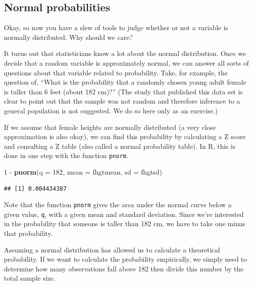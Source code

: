 \documentclass[]{article}
\newenvironment{Shaded}{\begin{snugshade}}{\end{snugshade}}
\newcommand{\KeywordTok}[1]{\textcolor[rgb]{0.13,0.29,0.53}{\textbf{{#1}}}}
\newcommand{\DataTypeTok}[1]{\textcolor[rgb]{0.13,0.29,0.53}{{#1}}}
\newcommand{\DecValTok}[1]{\textcolor[rgb]{0.00,0.00,0.81}{{#1}}}
\newcommand{\StringTok}[1]{\textcolor[rgb]{0.31,0.60,0.02}{{#1}}}
\newcommand{\NormalTok}[1]{{#1}}
\begin{document}
\subsection{Normal probabilities}\label{normal-probabilities}

Okay, so now you have a slew of tools to judge whether or not a variable
is normally distributed. Why should we care?

It turns out that statisticians know a lot about the normal
distribution. Once we decide that a random variable is approximately
normal, we can answer all sorts of questions about that variable related
to probability. Take, for example, the question of, ``What is the
probability that a randomly chosen young adult female is taller than 6
feet (about 182 cm)?'' (The study that published this data set is clear
to point out that the sample was not random and therefore inference to a
general population is not suggested. We do so here only as an exercise.)

If we assume that female heights are normally distributed (a very close
approximation is also okay), we can find this probability by calculating
a Z score and consulting a Z table (also called a normal probability
table). In R, this is done in one step with the function \texttt{pnorm}.

\begin{Shaded}
\begin{Highlighting}[]
\DecValTok{1} \NormalTok{-}\StringTok{ }\KeywordTok{pnorm}\NormalTok{(}\DataTypeTok{q =} \DecValTok{182}\NormalTok{, }\DataTypeTok{mean =} \NormalTok{fhgtmean, }\DataTypeTok{sd =} \NormalTok{fhgtsd)}
\end{Highlighting}
\end{Shaded}

\begin{verbatim}
## [1] 0.004434387
\end{verbatim}

Note that the function \texttt{pnorm} gives the area under the normal
curve below a given value, \texttt{q}, with a given mean and standard
deviation. Since we're interested in the probability that someone is
taller than 182 cm, we have to take one minus that probability.

Assuming a normal distribution has allowed us to calculate a theoretical
probability. If we want to calculate the probability empirically, we
simply need to determine how many observations fall above 182 then
divide this number by the total sample size.
\end{document}
